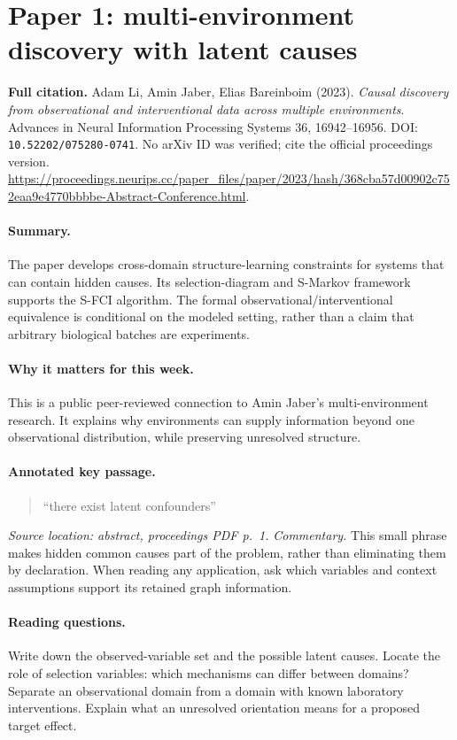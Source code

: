 \documentclass[11pt]{scrartcl}
\begin{document}
\clearpage
\section*{Paper 1: multi-environment discovery with latent causes}
\textbf{Full citation.} Adam Li, Amin Jaber, Elias Bareinboim (2023).
\emph{Causal discovery from observational and interventional data across multiple
environments}. Advances in Neural Information Processing Systems 36, 16942--16956.
DOI: \texttt{10.52202/075280-0741}. No arXiv ID was verified; cite the official
proceedings version.
\url{https://proceedings.neurips.cc/paper_files/paper/2023/hash/368cba57d00902c752eaa9e4770bbbbe-Abstract-Conference.html}.

\paragraph{Summary.} The paper develops cross-domain structure-learning constraints
for systems that can contain hidden causes. Its selection-diagram and S-Markov
framework supports the S-FCI algorithm. The formal observational/interventional
equivalence is conditional on the modeled setting, rather than a claim that arbitrary
biological batches are experiments.

\paragraph{Why it matters for this week.} This is a public peer-reviewed connection
to Amin Jaber's multi-environment research. It explains why environments can supply
information beyond one observational distribution, while preserving unresolved structure.

\paragraph{Annotated key passage.}
\begin{quote}
``there exist latent confounders''
\end{quote}
\emph{Source location: abstract, proceedings PDF p.~1.}
\emph{Commentary.} This small phrase makes hidden common causes part of the problem,
rather than eliminating them by declaration. When reading any application, ask which
variables and context assumptions support its retained graph information.

\paragraph{Reading questions.} Write down the observed-variable set and the possible
latent causes. Locate the role of selection variables: which mechanisms can differ
between domains? Separate an observational domain from a domain with known laboratory
interventions. Explain what an unresolved orientation means for a proposed target effect.
\end{document}
